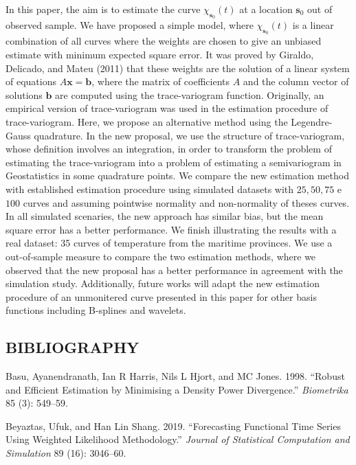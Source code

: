 \documentclass[12pt,]{article}
\theoremstyle{definition}
\theoremstyle{definition}
\theoremstyle{definition}
\theoremstyle{remark}
\begin{document}
In this paper, the aim is to estimate the curve \(\chi_{\bm{s}_0}(t)\) at a location \(\bm{s}_0\) out of observed sample. We have proposed a simple model, where \(\chi_{\bm{s}_0}(t)\) is a linear combination of all curves where the weights are chosen to give an unbiased estimate with minimum expected square error. It was proved by Giraldo, Delicado, and Mateu (2011) that these weights are the solution of a linear system of equations \(A \bm{x} = \bm{b}\), where the matrix of coefficients \(A\) and the column vector of solutions \(\bm{b}\) are computed using the trace-variogram function. Originally, an empirical version of trace-variogram was used in the estimation procedure of trace-variogram. Here, we propose an alternative method using the Legendre-Gauss quadrature. In the new proposal, we use the structure of trace-variogram, whose definition involves an integration, in order to transform the problem of estimating the trace-variogram into a problem of estimating a semivariogram in Geostatistics in some quadrature points. We compare the new estimation method with established estimation procedure using simulated datasets with \(25,50,75\) e \(100\) curves and assuming pointwise normality and non-normality of theses curves. In all simulated scenaries, the new approach has similar bias, but the mean square error has a better performance. We finish illustrating the results with a real dataset: 35 curves of temperature from the maritime provinces. We use a out-of-sample measure to compare the two estimation methods, where we observed that the new proposal has a better performance in agreement with the simulation study. Additionally, future works will adapt the new estimation procedure of an unmonitered curve presented in this paper for other basis functions including B-splines and wavelets.

\newpage

\hypertarget{bibliography}{%
\subsection*{BIBLIOGRAPHY}\label{bibliography}}

\hypertarget{refs}{}
\leavevmode\hypertarget{ref-basu1998robust}{}%
Basu, Ayanendranath, Ian R Harris, Nils L Hjort, and MC Jones. 1998. ``Robust and Efficient Estimation by Minimising a Density Power Divergence.'' \emph{Biometrika} 85 (3): 549--59.

\leavevmode\hypertarget{ref-beyaztas2019forecasting}{}%
Beyaztas, Ufuk, and Han Lin Shang. 2019. ``Forecasting Functional Time Series Using Weighted Likelihood Methodology.'' \emph{Journal of Statistical Computation and Simulation} 89 (16): 3046--60.
\end{document}
